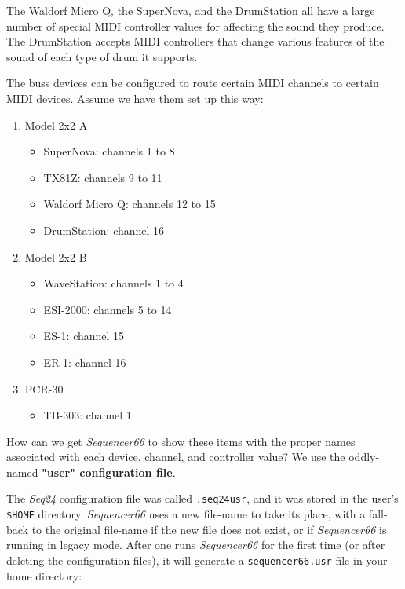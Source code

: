    The Waldorf Micro Q, the SuperNova, and the DrumStation all have a large
   number of special MIDI controller values for affecting the sound they
   produce.  The DrumStation accepts MIDI controllers that change various
   features of the sound of each type of drum it supports.

   The buss devices can be configured to route certain
   MIDI channels to certain MIDI devices.  Assume we have them
   set up this way:

   \begin{enumerate}
      \item Model 2x2 A
      \begin{itemize}
         \item SuperNova: channels 1 to 8
         \item TX81Z: channels 9 to 11
         \item Waldorf Micro Q: channels 12 to 15
         \item DrumStation: channel 16
      \end{itemize}
      \item Model 2x2 B
      \begin{itemize}
         \item WaveStation: channels 1 to 4
         \item ESI-2000: channels 5 to 14
         \item ES-1: channel 15
         \item ER-1: channel 16
      \end{itemize}
      \item PCR-30
      \begin{itemize}
         \item TB-303: channel 1
      \end{itemize}
   \end{enumerate}

   How can we get \textsl{Sequencer66} to show these items with the proper
   names associated with each device, channel, and controller value?
   We use the oddly-named \textbf{"user" configuration file}.

   The \textsl{Seq24} configuration file was called
   \texttt{.seq24usr}, and it was stored in the user's \texttt{\$HOME}
   directory.
   \textsl{Sequencer66} uses a new file-name
   to take its place, with a fall-back to the original file-name if the new
   file does not exist, or if \textsl{Sequencer66} is running in
   legacy mode.
   After one runs \textsl{Sequencer66} for the first time (or after deleting
   the configuration files), it will generate a
   \texttt{sequencer66.usr} file in your home directory:

